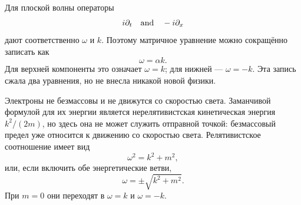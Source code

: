 Для плоской волны операторы
\begin{equation}
i\partial_t
\quad\hbox{and}\quad
-i\partial_x
\end{equation}
дают соответственно \(\omega\) и \(k\). Поэтому матричное уравнение можно сокращённо записать как
\begin{equation}
\omega=\alpha k.
\end{equation}
Для верхней компоненты это означает \(\omega=k\); для нижней — \(\omega=-k\). Эта запись сжала два уравнения, но не внесла никакой новой физики.

Электроны не безмассовы и не движутся со скоростью света. Заманчивой формулой для их энергии является нерелятивистская кинетическая энергия \(k^2/(2m)\), но здесь она не может служить отправной точкой: безмассовый предел уже относится к движению со скоростью света. Релятивистское соотношение имеет вид
\begin{equation}
\omega^2=k^2+m^2,
\end{equation}
или, если включить обе энергетические ветви,
\begin{equation}
\omega=\pm\sqrt{k^2+m^2}.
\end{equation}
При \(m=0\) они переходят в \(\omega=k\) и \(\omega=-k\).

\begin{classroomqa}
\end{classroomqa}

\begin{classroomqa}
\end{classroomqa}

